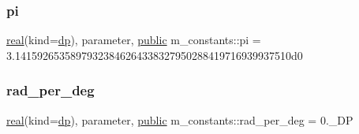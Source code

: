 \mbox{\label{namespacem__constants_a3ce903650fe1630c8957cdf487778e7f}} 
\subsubsection{\texorpdfstring{pi}{pi}}
{\footnotesize\ttfamily \hyperlink{read__watch_83_8txt_abdb62bde002f38ef75f810d3a905a823}{real}(kind=\hyperlink{namespacem__constants_a15743b6f1a6f57ab5b842d79fbffdd98}{dp}), parameter, \hyperlink{M__stopwatch_83_8txt_a2f74811300c361e53b430611a7d1769f}{public} m\+\_\+constants\+::pi = 3.\+14159265358979323846264338327950288419716939937510d0}

\mbox{\label{namespacem__constants_a365f3d8b9c36ceb901d7bc9631a7be0c}} 
\subsubsection{\texorpdfstring{rad\+\_\+per\+\_\+deg}{rad\_per\_deg}}
{\footnotesize\ttfamily \hyperlink{read__watch_83_8txt_abdb62bde002f38ef75f810d3a905a823}{real}(kind=\hyperlink{namespacem__constants_a15743b6f1a6f57ab5b842d79fbffdd98}{dp}), parameter, \hyperlink{M__stopwatch_83_8txt_a2f74811300c361e53b430611a7d1769f}{public} m\+\_\+constants\+::rad\+\_\+per\+\_\+deg = 0.\+\_\+\+DP}

